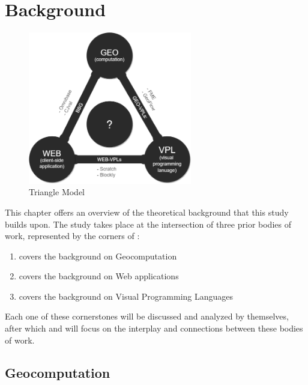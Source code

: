 
\chapter{Background}
\label{chap:background}

\begin{figure}
  \centering
  \graphicspath{ {../../assets/diagrams/} }
  \includegraphics[width=270px]{geo-web-vpl.png}
  \caption{Triangle Model}
  \label{fig:triangle-model}
\end{figure}

This chapter offers an overview of the theoretical background that this study builds upon.
The study takes place at the intersection of three prior bodies of work,  represented by the corners of :
\begin{enumerate}[-]
  \item {} covers the background on Geocomputation
  \item {} covers the background on Web applications
  \item {} covers the background on Visual Programming Languages
\end{enumerate}
Each one of these cornerstones will be discussed and analyzed by themselves, after which  and  will focus on the interplay and connections between these bodies of work. 

\section{Geocomputation}
\label{sec:background-geo}

